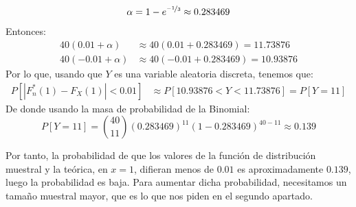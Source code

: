 \begin{ejercicio}
\begin{equation*}
        \alpha = 1-e^{\nicefrac{-1}{3}}\approx 0.283469
    \end{equation*}
    Entonces:
    \begin{align*}
        40(0.01 + \alpha) &\approx 40(0.01+0.283469)= 11.73876 \\
        40(-0.01 + \alpha) &\approx 40(-0.01 + 0.283469)  = 10.93876
    \end{align*}
    Por lo que, usando que $Y$ es una variable aleatoria discreta, tenemos que:
    \begin{align*}
        P[|F_n^\ast(1) - F_X(1)| < 0.01] &\approx P[10.93876 < Y < 11.73876] = P[Y=11]
    \end{align*}
    De donde usando la masa de probabilidad de la Binomial:
    \begin{equation*}
        P[Y=11] = \binom{40}{11} {(0.283469)}^{11} {(1-0.283469)}^{40-11} \approx 0.139
    \end{equation*}

    Por tanto, la probabilidad de que los valores de la función de distribución muestral y la teórica, en $x=1$, difieran menos de $0.01$ es aproximadamente $0.139$, luego la probabilidad es baja. Para aumentar dicha probabilidad, necesitamos un tamaño muestral mayor, que es lo que nos piden en el segundo apartado.\\


\end{ejercicio}
